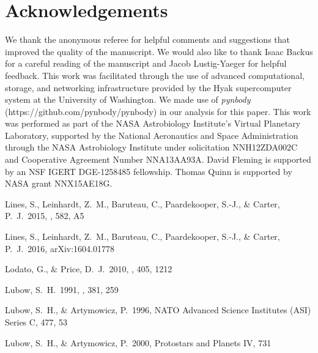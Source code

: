 \section{Acknowledgements}

We thank the anonymous referee for helpful comments and suggestions that improved the quality
of the manuscript. We would also like to thank Isaac Backus for a careful reading of the manuscript and
Jacob Lustig-Yaeger for helpful feedback. 
This work was facilitated through the use of advanced computational, storage, and networking
infrastructure provided by the Hyak supercomputer system at the
University of Washington.  We made use of {\em pynbody}
(https://github.com/pynbody/pynbody) in our analysis for this paper.
This work was performed as part of the NASA Astrobiology Institute's
Virtual Planetary Laboratory, supported by the National Aeronautics
and Space Administration through the NASA Astrobiology Institute under
solicitation NNH12ZDA002C and Cooperative Agreement Number
NNA13AA93A.  David Fleming is supported by an NSF IGERT DGE-1258485 fellowship.
Thomas Quinn is supported by NASA grant NNX15AE18G.




 Lines, S., Leinhardt, Z.~M., Baruteau, C., Paardekooper, S.-J., \& Carter, P.~J.\ 2015, \aap, 582, A5


 Lines, S., Leinhardt, Z.~M., Baruteau, C., Paardekooper, S.-J., \& Carter, P.~J.\ 2016, arXiv:1604.01778

 Lodato, G., \& Price, D.~J.\ 2010, \mnras, 405, 1212


 Lubow, S.~H.\ 1991, \apj, 381, 259 

 Lubow, S.~H., \& Artymowicz, P.\ 1996, NATO Advanced Science Institutes (ASI) Series C, 477, 53


 Lubow, S.~H., \& Artymowicz, P.\ 2000, Protostars and Planets IV, 731

